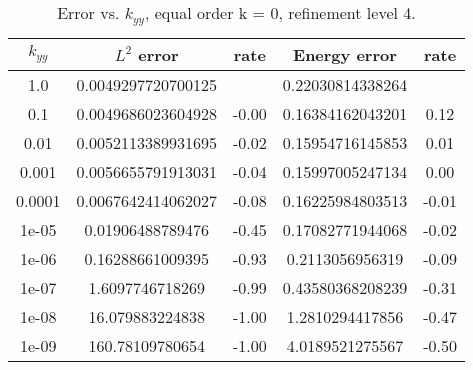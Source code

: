 \documentclass[10pt]{article}
\begin{document}
\begin{table}[ht]
\centering
\caption{Error vs. $k_{yy}$, equal order k = 0, refinement level 4.}
\begin{tabular}{c|cc|cc}
$k_{yy}$  &   $L^2$ error       &  rate    & Energy error & rate \\
\hline
1.0     &   0.0049297720700125  &         & 0.22030814338264 &                  \\
0.1     &   0.0049686023604928  &   -0.00 & 0.16384162043201 &  0.12 \\
0.01    &   0.0052113389931695  &   -0.02 & 0.15954716145853 &  0.01 \\
0.001   &   0.0056655791913031  &   -0.04 & 0.15997005247134 &  0.00 \\
0.0001  &   0.0067642414062027  &   -0.08 & 0.16225984803513 & -0.01 \\
1e-05   &   0.01906488789476    &   -0.45 & 0.17082771944068 & -0.02 \\
1e-06   &   0.16288661009395    &   -0.93 & 0.2113056956319  & -0.09 \\
1e-07   &   1.6097746718269     &   -0.99 & 0.43580368208239 & -0.31 \\
1e-08   &   16.079883224838     &   -1.00 & 1.2810294417856  & -0.47 \\
1e-09   &   160.78109780654     &   -1.00 & 4.0189521275567  & -0.50 \\
\end{tabular}                             
\end{table}

  \begin{figure}[ht]
    \centering
      \scalebox{0.7}{}%
      \scalebox{0.7}{}
      \scalebox{0.7}{}%
      \scalebox{0.7}{}
      \scalebox{0.7}{}%
      \scalebox{0.7}{}
  \end{figure}

  \begin{figure}[ht]
    \centering
      \scalebox{0.7}{}%
      \scalebox{0.7}{}
      \scalebox{0.7}{}%
      \scalebox{0.7}{}
      \scalebox{0.7}{}%
      \scalebox{0.7}{}
  \end{figure}
\FloatBarrier
\end{document}
